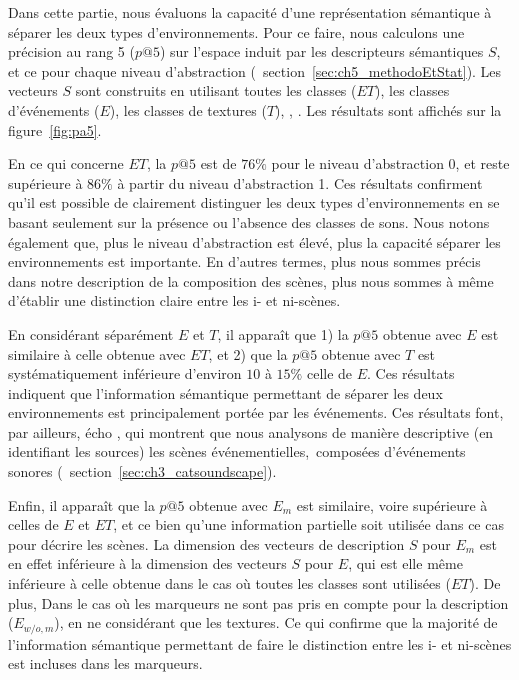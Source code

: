 Dans cette partie, nous évaluons la capacité d'une représentation sémantique à séparer les deux types d'environnements. Pour ce faire, nous calculons une précision au rang 5 ($p@5$) sur l'espace induit par les descripteurs sémantiques $S$, et ce pour chaque niveau d'abstraction (\cf~section~\ref{sec:ch5_methodoEtStat}). Les vecteurs $S$ sont construits en utilisant toutes les classes ($ET$), les classes d'événements ($E$), les classes de textures ($T$),  ,   . Les résultats sont affichés sur la figure~\ref{fig:pa5}.

En ce qui concerne $ET$, la $p@5$ est de $76\%$ pour le niveau d'abstraction 0, et reste supérieure à $86\%$ à partir du niveau d'abstraction 1. Ces résultats confirment qu'il est possible de clairement distinguer les deux types d'environnements en se basant seulement sur la présence ou l'absence des classes de sons. Nous notons également que, plus le niveau d'abstraction est élevé, plus la capacité   séparer les environnements est importante. En d'autres termes, plus nous sommes précis dans notre description de la composition des scènes, plus nous sommes à même d'établir une distinction claire entre les i- et ni-scènes.

En considérant séparément $E$ et $T$, il apparaît que 1) la $p@5$ obtenue avec $E$ est similaire à celle obtenue avec $ET$, et 2) que la $p@5$ obtenue avec $T$ est systématiquement inférieure d'environ $10$ à $15\%$   celle de $E$. Ces résultats indiquent que l'information sémantique permettant de séparer les deux environnements est principalement portée par les événements. Ces résultats font, par ailleurs, écho    \citep{maffiolo_caracterisation_1999},  qui montrent que nous analysons de manière descriptive (en identifiant les sources) les scènes événementielles,\ie~composées d'événements sonores (\cf~section~\ref{sec:ch3_catsoundscape}).

Enfin, il apparaît que la $p@5$ obtenue avec $E_{m}$ est similaire, voire supérieure à celles de $E$ et $ET$, et ce bien qu'une information partielle soit utilisée dans ce cas pour décrire les scènes. La dimension des vecteurs de description $S$ pour $E_m$ est en effet inférieure à la dimension des vecteurs $S$ pour $E$, qui est elle même inférieure à celle obtenue dans le cas où toutes les classes sont utilisées ($ET$). De plus, Dans le cas où les marqueurs ne sont pas pris en compte pour la description ($E_{w/o,m}$),   en ne considérant que les textures. Ce qui confirme que la majorité de l'information sémantique permettant de faire le distinction entre les i- et ni-scènes est incluses dans les marqueurs.

